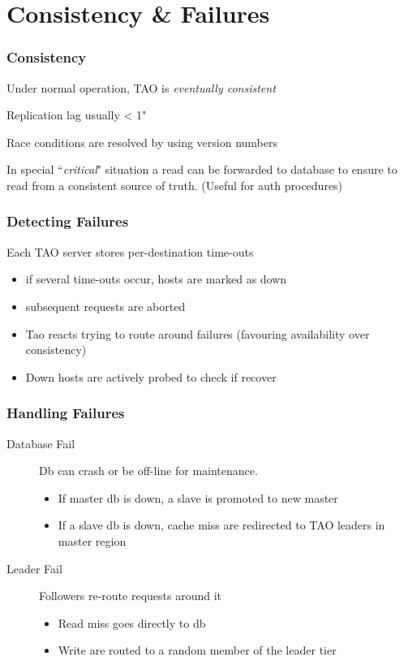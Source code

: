 \section{Consistency \& Failures}
\begin{frame}[t]\frametitle{Consistency}
	Under normal operation, TAO is \emph{eventually consistent}

	Replication lag usually < 1"

	Race conditions are resolved by using version numbers

	In special ``\emph{critical}" situation a read can be forwarded to database to ensure to read from a consistent source of truth. (Useful for auth procedures)

\end{frame}

\begin{frame}[t]\frametitle{Detecting Failures}
    Each TAO server stores per-destination time-outs
    \begin{itemize}
    	\item if several time-outs occur, hosts are marked as down
    	\item subsequent requests are aborted
    	\item Tao reacts trying to route around failures (favouring availability over consistency)
    	\item Down hosts are actively probed to check if recover
    \end{itemize}
\end{frame}

\begin{frame}[c]\frametitle{Handling Failures}
    \begin{description}
    	\item[Database Fail] Db can crash or be off-line for maintenance. 
    	\begin{itemize}
    		\item If master db is down, a slave is promoted to new master
    		\item If a slave db is down, cache miss are redirected to TAO leaders in master region
    	\end{itemize}
    	\item[Leader Fail] Followers re-route requests around it
    	\begin{itemize}
    		\item Read miss goes directly to db
    		\item Write are routed to a random member of the leader tier
    	\end{itemize}
    \end{description}
\end{frame}

